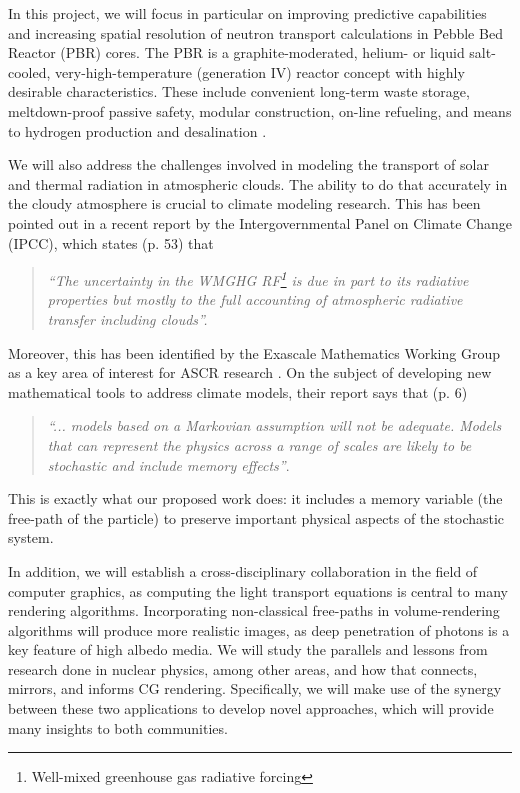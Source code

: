\documentclass[12pt]{article}
\begin{document}
In this project, we will focus in particular on improving predictive capabilities and increasing spatial resolution of neutron transport calculations in Pebble Bed Reactor (PBR) cores.
The PBR is a graphite-moderated, helium- or liquid salt-cooled, very-high-temperature (generation IV) reactor concept with highly desirable characteristics.
These include convenient long-term waste storage, meltdown-proof passive safety, modular construction, on-line refueling, and means to hydrogen production and desalination \cite{htrpm,pbmr,mpbr}.

We will also address the challenges involved in modeling the transport of solar and thermal radiation in atmospheric clouds.
The ability to do that accurately in the cloudy atmosphere is crucial to climate modeling research.
This has been pointed out in a recent report\cite{ipcc13} by the Intergovernmental Panel on Climate Change (IPCC), which states (p. 53) that
\begin{quote}
\textit{``The uncertainty in the WMGHG RF\footnote{Well-mixed greenhouse gas radiative forcing} is due in part to its radiative properties but mostly to the full accounting of atmospheric radiative transfer including clouds''.}
\end{quote}

Moreover, this has been identified by the Exascale Mathematics Working Group as a key area of interest for ASCR research \cite{amrec14}.
On the subject of developing new mathematical tools to address climate models, their report says that (p. 6)
\begin{quote}
\textit{``... models based on a Markovian assumption will not be adequate.
Models that can represent the physics across a range of scales are likely to be stochastic and include memory effects''}.
\end{quote}
This is exactly what our proposed work does: it includes a memory variable (the free-path of the particle) to preserve important physical aspects of the stochastic system.

In addition, we will establish a cross-disciplinary collaboration in the field of computer graphics, as computing the light transport equations is central to many rendering algorithms.
Incorporating non-classical free-paths in volume-rendering algorithms will produce more realistic images, as deep penetration of photons is a key feature of high albedo media.
We will study the parallels and lessons from research done in nuclear physics, among other areas, and how that connects, mirrors, and informs CG rendering.
Specifically, we will make use of the synergy between these two applications to develop novel approaches, which will provide many insights to both communities.
\end{document}
